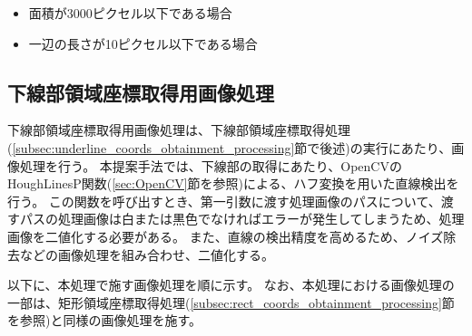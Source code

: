 \begin{itemize}
    \item 面積が3000ピクセル以下である場合
    \item 一辺の長さが10ピクセル以下である場合
\end{itemize}






\subsection{下線部領域座標取得用画像処理}\label{subsec:image_processing_for_underline_coords_obtainment}
下線部領域座標取得用画像処理は、下線部領域座標取得処理(\ref{subsec:underline_coords_obtainment_processing}節で後述)の実行にあたり、画像処理を行う。
本提案手法では、下線部の取得にあたり、OpenCVのHoughLinesP関数(\ref{sec:OpenCV}節を参照)による、ハフ変換を用いた直線検出を行う。
この関数を呼び出すとき、第一引数に渡す処理画像のパスについて、渡すパスの処理画像は白または黒色でなければエラーが発生してしまうため、処理画像を二値化する必要がある。
また、直線の検出精度を高めるため、ノイズ除去などの画像処理を組み合わせ、二値化する。

以下に、本処理で施す画像処理を順に示す。
なお、本処理における画像処理の一部は、矩形領域座標取得処理(\ref{subsec:rect_coords_obtainment_processing}節を参照)と同様の画像処理を施す。

